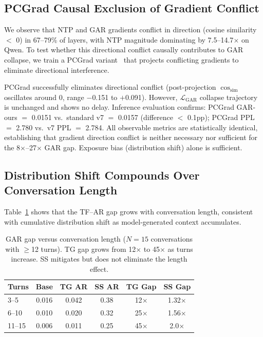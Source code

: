 \documentclass[11pt,a4paper]{article}
\begin{document}
\subsection{PCGrad Causal Exclusion of Gradient Conflict}
\label{sec:pcgrad}

We observe that NTP and GAR gradients conflict in direction (cosine similarity $<$ 0) in 67--79\% of layers, with NTP magnitude dominating by 7.5--14.7$\times$ on Qwen. To test whether this directional conflict causally contributes to GAR collapse, we train a PCGrad variant~\cite{yu2020gradient} that projects conflicting gradients to eliminate directional interference.

PCGrad successfully eliminates directional conflict (post-projection $\cos_{\text{sim}}$ oscillates around 0, range $-$0.151 to $+$0.091). However, $\mathcal{L}_{\text{GAR}}$ collapse trajectory is unchanged and shows no delay. Inference evaluation confirms: PCGrad GAR-ours $=$ 0.0151 vs.\ standard v7 $=$ 0.0157 (difference $<$ 0.1pp); PCGrad PPL $=$ 2.780 vs.\ v7 PPL $=$ 2.784. All observable metrics are statistically identical, establishing that gradient direction conflict is neither necessary nor sufficient for the 8$\times$--27$\times$ GAR gap. Exposure bias (distribution shift) alone is sufficient.

\subsection{Distribution Shift Compounds Over Conversation Length}

Table~\ref{tab:long_conv} shows that the TF--AR gap grows with conversation length, consistent with cumulative distribution shift as model-generated context accumulates.

\begin{table}[t]
\centering
\small
\caption{GAR gap versus conversation length ($N{=}15$ conversations with $\geq$12 turns). TG gap grows from 12$\times$ to 45$\times$ as turns increase. SS mitigates but does not eliminate the length effect.}
\label{tab:long_conv}
\begin{tabular}{@{}lccccc@{}}
\toprule
Turns & Base & TG AR & SS AR & TG Gap & SS Gap \\
\midrule
3--5 & 0.016 & 0.042 & 0.38 & 12$\times$ & 1.32$\times$ \\
6--10 & 0.010 & 0.020 & 0.32 & 25$\times$ & 1.56$\times$ \\
11--15 & 0.006 & 0.011 & 0.25 & 45$\times$ & 2.0$\times$ \\
\bottomrule
\end{tabular}
\end{table}
\end{document}
